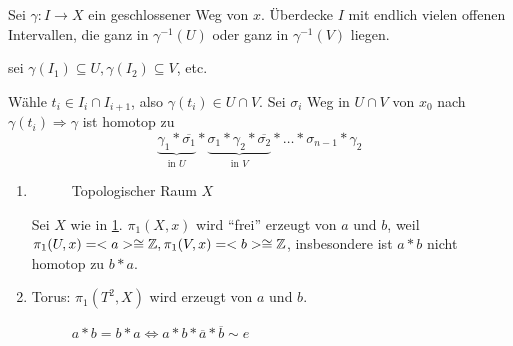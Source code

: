 \begin{beweis}
    Sei $\gamma: I \rightarrow X$ ein geschlossener Weg von $x$.
    Überdecke $I$ mit endlich vielen offenen Intervallen, die ganz in 
    $\gamma^{-1}(U)$ oder ganz in $\gamma^{-1}(V)$ liegen.

    \Obda sei $\gamma(I_1) \subseteq U, \gamma(I_2) \subseteq V$, etc.

    Wähle $t_i \in I_i \cap I_{i+1}$, also $\gamma(t_i) \in U \cap V$.
    Sei $\sigma_i$ Weg in $U \cap V$ von $x_0$ nach $\gamma(t_i) \Rightarrow \gamma$
    ist homotop zu 
    \[\underbrace{\gamma_1 * \overline{\sigma_1}}_{\text{in } U} * \underbrace{\sigma_1 * \gamma_2 * \overline{\sigma_2}}_{\text{in } V} * \dots * \sigma_{n-1} * \gamma_2\]
\end{beweis}

\begin{beispiel}
    \begin{enumerate}[label=\arabic*)]
        \item
            \begin{figure}
                \centering
                
                \caption{Topologischer Raum $X$}
                \label{fig:top-raum-kreise}
            \end{figure}

            Sei $X$ wie in \cref{fig:top-raum-kreise}. $\pi_1(X,x)$ wird \enquote{frei} erzeugt von $a$ und $b$, weil
            $\pi_1(U,x) = <a> \cong \mathbb{Z}, \pi_1(V,x) = <b> \cong \mathbb{Z}$,
            insbesondere ist $a*b$ nicht homotop zu $b*a$.
        \item Torus: $\pi_1(T^2, X)$ wird erzeugt von $a$ und $b$.
            \begin{figure}
                \centering
                
                \caption{$a*b = b*a \Leftrightarrow a * b * \overline{a} * \overline{b} \sim e$}
                \label{fig:torous-a-b}
            \end{figure}
            \end{enumerate}
\end{beispiel}


